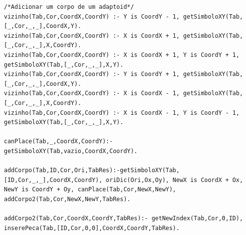 \documentclass[a4paper]{article}
\begin{document}
\begin{lstlisting}
/*Adicionar um corpo de um adaptoid*/
vizinho(Tab,Cor,CoordX,CoordY) :- Y is CoordY - 1, getSimboloXY(Tab,[_,Cor,_,_],CoordX,Y).
vizinho(Tab,Cor,CoordX,CoordY) :- X is CoordX + 1, getSimboloXY(Tab,[_,Cor,_,_],X,CoordY).
vizinho(Tab,Cor,CoordX,CoordY) :- X is CoordX + 1, Y is CoordY + 1, getSimboloXY(Tab,[_,Cor,_,_],X,Y).
vizinho(Tab,Cor,CoordX,CoordY) :- Y is CoordY + 1, getSimboloXY(Tab,[_,Cor,_,_],CoordX,Y).
vizinho(Tab,Cor,CoordX,CoordY) :- X is CoordX - 1, getSimboloXY(Tab,[_,Cor,_,_],X,CoordY).
vizinho(Tab,Cor,CoordX,CoordY) :- X is CoordX - 1, Y is CoordY - 1, getSimboloXY(Tab,[_,Cor,_,_],X,Y).

canPlace(Tab,_,CoordX,CoordY):-   getSimboloXY(Tab,vazio,CoordX,CoordY).

addCorpo(Tab,ID,Cor,Ori,TabRes):-getSimboloXY(Tab,[ID,Cor,_,_],CoordX,CoordY), oriDic(Ori,Ox,Oy), NewX is CoordX + Ox, NewY is CoordY + Oy, canPlace(Tab,Cor,NewX,NewY), addCorpo2(Tab,Cor,NewX,NewY,TabRes).

addCorpo2(Tab,Cor,CoordX,CoordY,TabRes):- getNewIndex(Tab,Cor,0,ID), inserePeca(Tab,[ID,Cor,0,0],CoordX,CoordY,TabRes).
\end{lstlisting}
\end{document}
